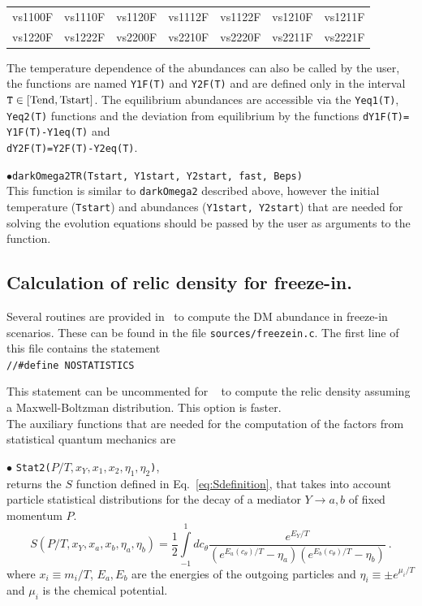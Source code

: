\documentclass[12pt,a4paper]{article}
\begin{document}
\begin{center}
\begin{tabular}{ l l l l l l l }
vs1100F & vs1110F & vs1120F&vs1112F&vs1122F&vs1210F&vs1211F\\
vs1220F&vs1222F&vs2200F&vs2210F&vs2220F&vs2211F& vs2221F
\end{tabular}
\end{center} 

The  temperature dependence  of the abundances can also be called by the user, the functions are named {\tt Y1F(T)} and {\tt Y2F(T)} and are defined only in the  interval ${\tt T}\in
[\rm{Tend},\rm{Tstart}]$. The equilibrium abundances are accessible via  the  { \tt Yeq1(T)}, { \tt Yeq2(T)} functions and the deviation from equilibrium  
by the functions
 {\tt dY1F(T)= Y1F(T)-Y1eq(T)}  and \\
   { \tt dY2F(T)=Y2F(T)-Y2eq(T)}.

\noindent
$\bullet$\verb|darkOmega2TR(Tstart, Y1start, Y2start, fast, Beps)|\\
This function is similar to \verb|darkOmega2| described above, however the initial temperature (\verb|Tstart|) and abundances (\verb|Y1start, Y2start|) that are needed for solving the evolution equations should be  passed by the user as arguments to the function. 


\subsection{Calculation of relic density for freeze-in.}
\label{sec:routines} 

Several routines are provided in \micro~to compute the DM abundance in freeze-in scenarios. These can be found in the file \verb|sources/freezein.c|. The first line of this file contains the statement \\
\verb|//#define NOSTATISTICS|

\noindent
This statement can be uncommented for \micro~ to compute the relic density assuming a Maxwell-Boltzman distribution. This option is faster. 
\\
The auxiliary functions that are needed for the computation of the factors from statistical quantum mechanics are 

\noindent
$\bullet$ \verb|Stat2(|$P/T,x_Y,x_1,x_2,\eta_1,\eta_2$\verb|)|,\\
 returns the $S$ function defined in Eq.~\eqref{eq:Sdefinition}, that takes into account particle statistical distributions for the decay of a mediator $Y \rightarrow a,b$ of fixed momentum $P$. 
\begin{equation}\label{eq:Sdefinition}
S\left( P/T, x_Y, x_a, x_b, \eta_a, \eta_b \right)= \frac{1}{2}\int\limits_{-1}^{1} dc_{\theta}
\frac{e^{E_Y/T}}{(e^{E_a(c_\theta)/T} - \eta_a)(e^{E_b(c_\theta)/T} - \eta_b)}\ .
\end{equation}
where $x_i \equiv m_i/T$, $E_a,E_b$ are the energies of the outgoing particles and $\eta_i \equiv \pm e^{\mu_i/T}$ and $\mu_i$ is the chemical potential.\\
\end{document}
